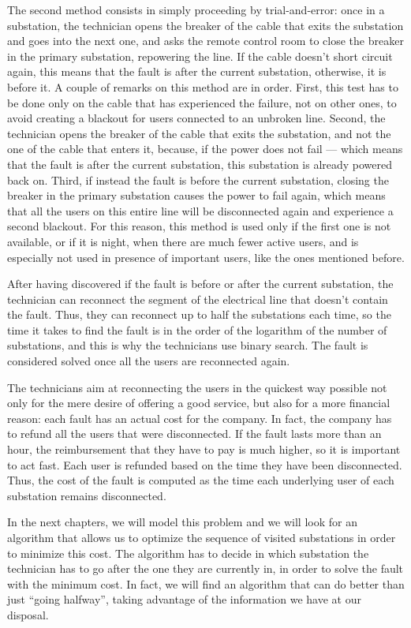 The second method consists in simply proceeding by trial-and-error: once in a substation, the technician opens the breaker of the cable that exits the substation and goes into the next one, and asks the remote control room to close the breaker in the primary substation, repowering the line. If the cable doesn't short circuit again, this means that the fault is after the current substation, otherwise, it is before it. A couple of remarks on this method are in order. First, this test has to be done only on the cable that has experienced the failure, not on other ones, to avoid creating a blackout for users connected to an unbroken line. Second, the technician opens the breaker of the cable that exits the substation, and not the one of the cable that enters it, because, if the power does not fail --- which means that the fault is after the current substation, this substation is already powered back on.
Third, if instead the fault is before the current substation, closing the breaker in the primary substation causes the power to fail again, which means that all the users on this entire line will be disconnected again and experience a second blackout. For this reason, this method is used only if the first one is not available, or if it is night, when there are much fewer active users, and is especially not used in presence of important users, like the ones mentioned before.

After having discovered if the fault is before or after the current substation, the technician can reconnect the segment of the electrical line that doesn't contain the fault. Thus, they can reconnect up to half the substations each time, so the time it takes to find the fault is in the order of the logarithm of the number of substations, and this is why the technicians use binary search. The fault is considered solved once all the users are reconnected again.

The technicians aim at reconnecting the users in the quickest way possible not only for the mere desire of offering a good service, but also for a more financial reason: each fault has an actual cost for the company. In fact, the company has to refund all the users that were disconnected. If the fault lasts more than an hour, the reimbursement that they have to pay is much higher, so it is important to act fast. Each user is refunded based on the time they have been disconnected. Thus, the cost of the fault is computed as the time each underlying user of each substation remains disconnected.

In the next chapters, we will model this problem and we will look for an algorithm that allows us to optimize the sequence of visited substations in order to minimize this cost. The algorithm has to decide in which substation the technician has to go after the one they are currently in, in order to solve the fault with the minimum cost. In fact, we will find an algorithm that can do better than just ``going halfway'', taking advantage of the information we have at our disposal.